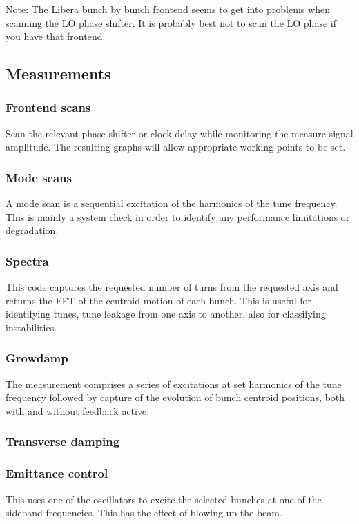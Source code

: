 \documentclass{report}
\begin{document}
Note: The Libera bunch by bunch frontend seems to get into problems when scanning the LO phase shifter. It is probably best not to scan the LO phase if you have that frontend.

\subsection{Measurements}
\subsubsection{Frontend scans}
Scan the relevant phase shifter or clock delay while monitoring the measure signal amplitude. The resulting graphs will allow appropriate working points to be set.

\subsubsection{Mode scans}
A mode scan is a sequential excitation of the harmonics of the tune frequency. This is mainly a system check in order to identify any performance limitations or degradation.

\subsubsection{Spectra}
This code captures the requested number of turns from the requested axis and returns the FFT of the centroid motion of each bunch. This is useful for identifying tunes, tune leakage from one axis to another, also for classifying instabilities.

\subsubsection{Growdamp}
The measurement comprises a series of excitations at set harmonics of the tune frequency followed by capture of the evolution of bunch centroid positions, both with and without feedback active.

\subsubsection{Transverse damping}

\subsubsection{Emittance control}
This uses one of the oscillators to excite the selected bunches at one of the sideband frequencies. This has the effect of blowing up the beam.
\end{document}
